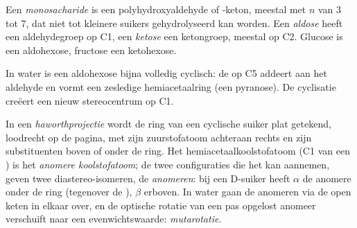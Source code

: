 \begin{definition}[Monosachariden]\label{def:b2:biomolecules:sugar}
Een \emph{monosacharide} is een polyhydroxyaldehyde of -keton, meestal
 met $n$ van 3 tot 7, dat niet tot kleinere suikers gehydrolyseerd kan worden. Een
\emph{aldose} heeft een aldehydegroep op C1, een \emph{ketose} een ketongroep,
meestal op C2. Glucose is een aldohexose, fructose een ketohexose.
\end{definition}

In water is een aldohexose bijna volledig cyclisch: de  op C5 addeert aan het aldehyde en vormt een
zesledige hemiacetaalring (een pyranose). De cyclisatie creëert een nieuw stereocentrum op C1.

\begin{definition}[Anomeren]\label{def:b2:biomolecules:anomer}
In een \emph{haworthprojectie} wordt de ring van een cyclische suiker plat getekend,
loodrecht op de pagina, met zijn zuurstofatoom achteraan rechts en zijn substituenten boven of onder de
ring. Het hemiacetaalkoolstofatoom (C1 van een ) is het \emph{anomere koolstofatoom}; de
twee configuraties die het kan aannemen, geven twee diastereo-isomeren, de \emph{anomeren}: bij een D-suiker
heeft $\alpha$ de anomere  onder de ring (tegenover de ), $\beta$ erboven. In
water gaan de anomeren via de open keten in elkaar over, en de optische rotatie van een pas opgelost
anomeer verschuift naar een evenwichtswaarde: \emph{mutarotatie}.
\end{definition}

